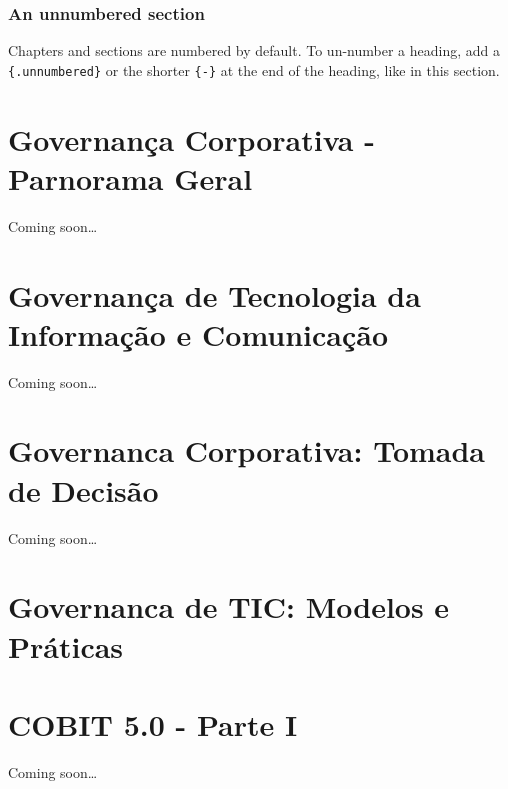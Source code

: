\documentclass[
]{book}
\begin{document}
\subsection*{An unnumbered section}\label{an-unnumbered-section}

Chapters and sections are numbered by default. To un-number a heading, add a \texttt{\{.unnumbered\}} or the shorter \texttt{\{-\}} at the end of the heading, like in this section.

\chapter{Governança Corporativa - Parnorama Geral}\label{governanuxe7a-corporativa---parnorama-geral}

Coming soon\ldots{}

\chapter{Governança de Tecnologia da Informação e Comunicação}\label{governanuxe7a-de-tecnologia-da-informauxe7uxe3o-e-comunicauxe7uxe3o}

Coming soon\ldots{}

\chapter{Governanca Corporativa: Tomada de Decisão}\label{governanca-corporativa-tomada-de-decisuxe3o}

Coming soon\ldots{}

\chapter{Governanca de TIC: Modelos e Práticas}\label{governanca-de-tic-modelos-e-pruxe1ticas}

\chapter{COBIT 5.0 - Parte I}\label{cobit-5.0---parte-i}

Coming soon\ldots{}

  
\end{document}
